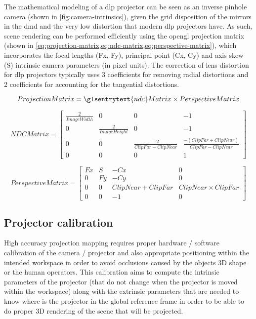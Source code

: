 The mathematical modeling of a \gls{dlp} projector can be seen as an inverse pinhole camera \cite{Hartley2003} (shown in \cref{fig:camera-intrinsics}), given the grid disposition of the mirrors in the \gls{dmd} and the very low distortion that modern \gls{dlp} projectors have. As such, scene rendering can be performed efficiently using the \gls{opengl} projection matrix (shown in \cref{eq:projection-matrix,eq:ndc-matrix,eq:perspective-matrix}), which incorporates the focal lengths (Fx, Fy), principal point (Cx, Cy) and axis skew (S) intrinsic camera parameters (in pixel units). The correction of lens distortion for \gls{dlp} projectors typically uses 3 coefficients for removing radial distortions and 2 coefficients for accounting for the tangential distortions.

{
	\small
	\begin{equation}\label{eq:projection-matrix}
	ProjectionMatrix = \glsentrytext{ndc}Matrix \times PerspectiveMatrix
	\end{equation}
	
	\begin{equation}\label{eq:ndc-matrix}
	NDCMatrix = 
	\begin{bmatrix}
	\frac{2}{ImageWidth} & 0 & 0 & -1 \\
	0 & \frac{2}{ImageHeight} & 0 & -1 \\
	0 & 0 & \frac{-2}{ClipFar - ClipNear} & \frac{-(ClipFar + ClipNear)}{ClipFar - ClipNear} \\
	0 & 0 & 0 & 1
	\end{bmatrix}
	\end{equation}
	
	
	\begin{equation}\label{eq:perspective-matrix}
	PerspectiveMatrix = 
	\begin{bmatrix}
	Fx & S & -Cx & 0 \\
	0 & Fy & -Cy & 0 \\
	0 & 0 & ClipNear + ClipFar & ClipNear \times ClipFar \\
	0 & 0 & -1 & 0
	\end{bmatrix}
	\end{equation}
}


\subsection{Projector calibration}

High accuracy projection mapping requires proper hardware / software calibration of the camera / projector and also appropriate positioning within the intended workspace in order to avoid occlusions caused by the objects 3D shape or the human operators. This calibration aims to compute the intrinsic parameters of the projector (that do not change when the projector is moved within the workspace) along with the extrinsic parameters that are needed to know where is the projector in the global reference frame in order to be able to do proper 3D rendering of the scene that will be projected.

